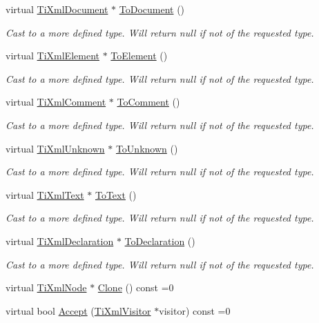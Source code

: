 \begin{DoxyCompactItemize}
virtual \hyperlink{class_ti_xml_document}{Ti\+Xml\+Document} $\ast$ \hyperlink{class_ti_xml_node_a6a4c8ac28ee7a745d059db6691e03bae}{To\+Document} ()
\begin{DoxyCompactList}\small\item\em Cast to a more defined type. Will return null if not of the requested type. \end{DoxyCompactList}\item 
virtual \hyperlink{class_ti_xml_element}{Ti\+Xml\+Element} $\ast$ \hyperlink{class_ti_xml_node_aa65d000223187d22a4dcebd7479e9ebc}{To\+Element} ()
\begin{DoxyCompactList}\small\item\em Cast to a more defined type. Will return null if not of the requested type. \end{DoxyCompactList}\item 
virtual \hyperlink{class_ti_xml_comment}{Ti\+Xml\+Comment} $\ast$ \hyperlink{class_ti_xml_node_a383e06a0787f7063953934867990f849}{To\+Comment} ()
\begin{DoxyCompactList}\small\item\em Cast to a more defined type. Will return null if not of the requested type. \end{DoxyCompactList}\item 
virtual \hyperlink{class_ti_xml_unknown}{Ti\+Xml\+Unknown} $\ast$ \hyperlink{class_ti_xml_node_a06de5af852668c7e4af0d09c205f0b0d}{To\+Unknown} ()
\begin{DoxyCompactList}\small\item\em Cast to a more defined type. Will return null if not of the requested type. \end{DoxyCompactList}\item 
virtual \hyperlink{class_ti_xml_text}{Ti\+Xml\+Text} $\ast$ \hyperlink{class_ti_xml_node_a3ddfbcac78fbea041fad57e5c6d60a03}{To\+Text} ()
\begin{DoxyCompactList}\small\item\em Cast to a more defined type. Will return null if not of the requested type. \end{DoxyCompactList}\item 
virtual \hyperlink{class_ti_xml_declaration}{Ti\+Xml\+Declaration} $\ast$ \hyperlink{class_ti_xml_node_a4027136ca820ff4a636b607231b6a6df}{To\+Declaration} ()
\begin{DoxyCompactList}\small\item\em Cast to a more defined type. Will return null if not of the requested type. \end{DoxyCompactList}\item 
virtual \hyperlink{class_ti_xml_node}{Ti\+Xml\+Node} $\ast$ \hyperlink{class_ti_xml_node_a4508cc3a2d7a98e96a54cc09c37a78a4}{Clone} () const =0
\item 
virtual bool \hyperlink{class_ti_xml_node_acc0f88b7462c6cb73809d410a4f5bb86}{Accept} (\hyperlink{class_ti_xml_visitor}{Ti\+Xml\+Visitor} $\ast$visitor) const =0
\end{DoxyCompactItemize}
